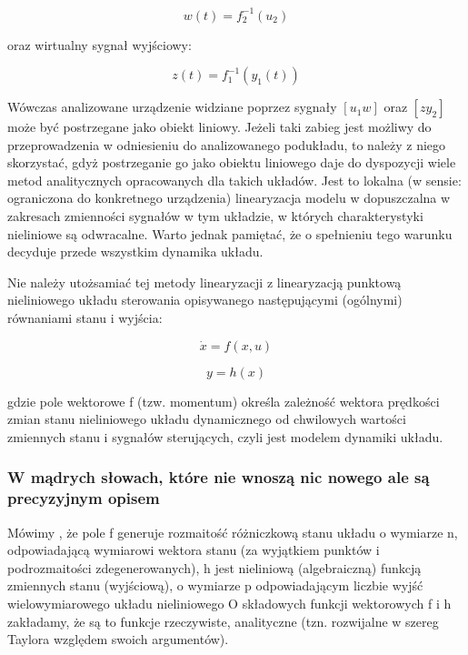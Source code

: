 \documentclass{article}
\begin{document}
		\begin{equation}
			w(t) = f_2^{-1}(u_2)
		\end{equation}

		oraz wirtualny sygnał wyjściowy:

		\begin{equation}
			z(t) = f_1^{-1}(y_1(t))
		\end{equation}

		Wówczas analizowane urządzenie widziane poprzez sygnały $ [ u_1 w ] $ oraz $ [ z y_2 ] $ może być
		postrzegane jako obiekt liniowy. Jeżeli taki zabieg jest możliwy do przeprowadzenia w
		odniesieniu do analizowanego podukładu, to należy z niego skorzystać, gdyż postrzeganie go
		jako obiektu liniowego daje do dyspozycji wiele metod analitycznych opracowanych dla takich
		układów. Jest to lokalna (w sensie: ograniczona do konkretnego urządzenia) linearyzacja
		modelu w dopuszczalna w zakresach zmienności sygnałów w tym układzie,
		w których charakterystyki nieliniowe są odwracalne. Warto jednak pamiętać, że o spełnieniu
		tego warunku decyduje przede wszystkim dynamika układu.

		Nie należy utożsamiać tej metody linearyzacji z linearyzacją punktową nieliniowego układu
		sterowania opisywanego następującymi (ogólnymi) równaniami stanu i wyjścia:

		\begin{equation}
			\dot{x} = f(x, u)
		\end{equation}

		\begin{equation}
			y = h(x)
		\end{equation}

		gdzie pole wektorowe f (tzw. momentum) określa zależność wektora prędkości zmian stanu
		nieliniowego układu dynamicznego od chwilowych wartości zmiennych stanu i sygnałów
		sterujących, czyli jest modelem dynamiki układu.

		\subsubsection{W mądrych słowach, które nie wnoszą nic nowego ale są precyzyjnym opisem}
			Mówimy , że pole f generuje rozmaitość różniczkową stanu układu o wymiarze n,
			odpowiadającą wymiarowi wektora stanu (za wyjątkiem punktów i podrozmaitości zdegenerowanych),
			h jest nieliniową (algebraiczną) funkcją zmiennych stanu (wyjściową), o wymiarze p 
			odpowiadającym liczbie wyjść wielowymiarowego układu nieliniowego O składowych
			funkcji wektorowych f i h zakładamy, że są to funkcje rzeczywiste, analityczne
			(tzn. rozwijalne w szereg Taylora względem swoich argumentów).
\end{document}
